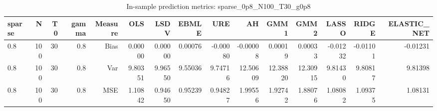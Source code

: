 \begin{table}[!htbp]\centering
\caption{In-sample prediction metrics: sparse_0p8_N100_T30_g0p8}
\label{tab:table2_sparse_0p8_N100_T30_g0p8}
\begin{tabular}{lrrrrrrrrrrrrrr}
\hline
sparse & N & T0 & gamma & Measure & OLS & LSDV & EBMLE & URE & AH & GMM1 & GMM2 & LASSO & RIDGE & ELASTIC_NET \\
\hline
0.8 & 100 & 30 & 0.8 & Bias & 0.00000 & 0.00000 & 0.00076 & -0.00080 & -0.00008 & 0.00019 & 0.00033 & -0.01232 & -0.01101 & -0.01231 \\
0.8 & 100 & 30 & 0.8 & Var & 9.80351 & 9.96550 & 9.55036 & 9.74716 & 12.50609 & 12.38820 & 12.30915 & 9.81430 & 9.80817 & 9.81398 \\
0.8 & 100 & 30 & 0.8 & MSE & 1.10842 & 0.94650 & 0.95239 & 0.94827 & 1.99556 & 1.92742 & 1.88076 & 1.08082 & 1.09375 & 1.08131 \\
\hline
\end{tabular}
\end{table}

